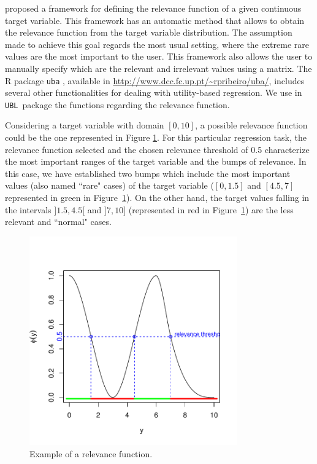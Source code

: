 \documentclass[10pt,a4paper]{article}\usepackage[]{graphicx}\usepackage[]{color}
\newenvironment{knitrout}{}{} %
\newcommand{\UBLp}{\texttt{UBL}\ package  }
\begin{document}
\cite{ribeiro2011utility} proposed a framework for defining the relevance function of a given continuous target variable. This framework has an automatic method that allows to obtain the relevance function from the target variable distribution. The assumption made to achieve this goal regards the most usual setting, where the extreme rare values are the most important to the user. This framework also allows the user to manually specify which are the relevant and irrelevant values using a matrix. The R package \texttt{uba} \cite{uba}, available in \url{http://www.dcc.fc.up.pt/~rpribeiro/uba/}, includes several other functionalities for dealing with utility-based regression. We use in \UBLp the functions regarding the relevance function.


Considering a target variable with domain $[0,10]$, a possible relevance function could be the one represented in Figure \ref{fig:relev_ex}. For this particular regression task, the relevance function selected and the chosen relevance threshold of 0.5 characterize the most important ranges of the target variable and the bumps of relevance. In this case, we have established two bumps which include the most important values (also named ``rare" cases) of the target variable ($[0, 1.5]$ and $[4.5, 7]$ represented in green in Figure~\ref{fig:relev_ex}). On the other hand, the target values falling in the intervals $]1.5, 4.5[$ and $]7,10]$ (represented in red in Figure~\ref{fig:relev_ex}) are the less relevant and ``normal" cases.


\begin{knitrout}\footnotesize
{}\color{fgcolor}\begin{figure}

{\centering \includegraphics[width=0.8\textwidth]{figures/UBL-relev_ex-1} 

}

\caption[Example of a relevance function]{Example of a relevance function.}\label{fig:relev_ex}
\end{figure}


\end{knitrout}
\end{document}

